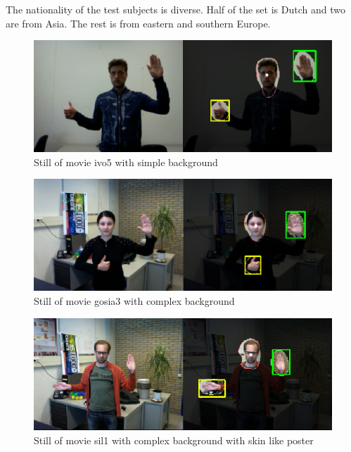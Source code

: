 The nationality of the test subjects is diverse. Half of the set is Dutch and two are from Asia. The rest is from eastern and southern Europe. 

\begin{figure}[tb]
\center{}
\includegraphics[width=0.8\linewidth]{figures/simple.png}
\caption{Still of movie ivo5 with simple background}
\label{fig:simplebackground}
\end{figure}

\begin{figure}[tb]
\center{}
\includegraphics[width=0.8\linewidth]{figures/complex.png}
\caption{Still of movie gosia3 with complex background}
\label{fig:complexbackground}
\end{figure}

\begin{figure}[tb]
\center{}
\includegraphics[width=0.8\linewidth]{figures/complexposter.png}
\caption{Still of movie sil1 with complex background with skin like poster}
\label{fig:complexposterbackground}
\end{figure}


